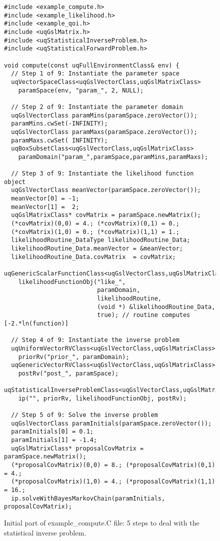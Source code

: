 \begin{figure}[h!]
\begin{center}
\begin{verbatim}
#include <example_compute.h>
#include <example_likelihood.h>
#include <example_qoi.h>
#include <uqGslMatrix.h>
#include <uqStatisticalInverseProblem.h>
#include <uqStatisticalForwardProblem.h>

void compute(const uqFullEnvironmentClass& env) {
  // Step 1 of 9: Instantiate the parameter space
  uqVectorSpaceClass<uqGslVectorClass,uqGslMatrixClass>
    paramSpace(env, "param_", 2, NULL);

  // Step 2 of 9: Instantiate the parameter domain
  uqGslVectorClass paramMins(paramSpace.zeroVector());
  paramMins.cwSet(-INFINITY);
  uqGslVectorClass paramMaxs(paramSpace.zeroVector());
  paramMaxs.cwSet( INFINITY);
  uqBoxSubsetClass<uqGslVectorClass,uqGslMatrixClass>
    paramDomain("param_",paramSpace,paramMins,paramMaxs);

  // Step 3 of 9: Instantiate the likelihood function object
  uqGslVectorClass meanVector(paramSpace.zeroVector());
  meanVector[0] = -1;
  meanVector[1] =  2;
  uqGslMatrixClass* covMatrix = paramSpace.newMatrix();
  (*covMatrix)(0,0) = 4.; (*covMatrix)(0,1) = 0.;
  (*covMatrix)(1,0) = 0.; (*covMatrix)(1,1) = 1.;
  likelihoodRoutine_DataType likelihoodRoutine_Data;
  likelihoodRoutine_Data.meanVector = &meanVector;
  likelihoodRoutine_Data.covMatrix  = covMatrix;
  uqGenericScalarFunctionClass<uqGslVectorClass,uqGslMatrixClass>
    likelihoodFunctionObj("like_",
                          paramDomain,
                          likelihoodRoutine,
                          (void *) &likelihoodRoutine_Data,
                          true); // routine computes [-2.*ln(function)]

  // Step 4 of 9: Instantiate the inverse problem
  uqUniformVectorRVClass<uqGslVectorClass,uqGslMatrixClass>
    priorRv("prior_", paramDomain);
  uqGenericVectorRVClass<uqGslVectorClass,uqGslMatrixClass>
    postRv("post_", paramSpace);
  uqStatisticalInverseProblemClass<uqGslVectorClass,uqGslMatrixClass>
    ip("", priorRv, likelihoodFunctionObj, postRv);

  // Step 5 of 9: Solve the inverse problem
  uqGslVectorClass paramInitials(paramSpace.zeroVector());
  paramInitials[0] = 0.1;
  paramInitials[1] = -1.4;
  uqGslMatrixClass* proposalCovMatrix = paramSpace.newMatrix();
  (*proposalCovMatrix)(0,0) = 8.; (*proposalCovMatrix)(0,1) = 4.;
  (*proposalCovMatrix)(1,0) = 4.; (*proposalCovMatrix)(1,1) = 16.;
  ip.solveWithBayesMarkovChain(paramInitials, proposalCovMatrix);
\end{verbatim}
\end{center}
\caption{
Initial part of example\_compute.C file: 5 steps to deal with the statistical inverse problem.
}
\label{fig-compute-c1}
\end{figure}

